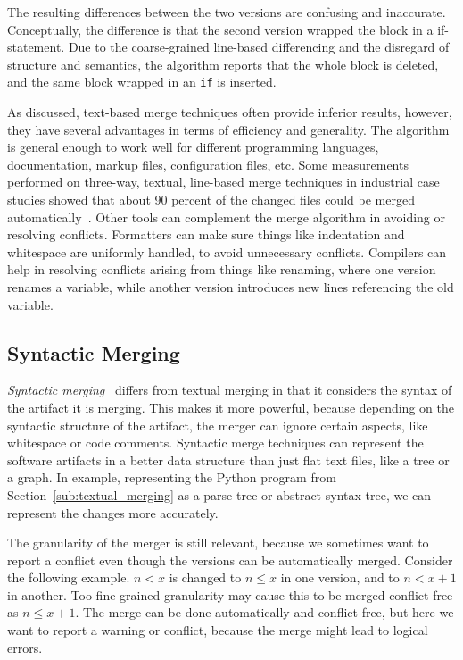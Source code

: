 \documentclass[a4paper,english]{ifimaster}
\begin{document}
The resulting differences between the two versions are confusing and inaccurate. Conceptually, the difference is that the second version wrapped the block in a if-statement. Due to the coarse-grained line-based differencing and the disregard of structure and semantics, the algorithm reports that the whole block is deleted, and the same block wrapped in an \texttt{if} is inserted.

As discussed, text-based merge techniques often provide inferior results, however, they have several advantages in terms of efficiency and generality. The algorithm is general enough to work well for different programming languages, documentation, markup files, configuration files, etc. Some measurements performed on three-way, textual, line-based merge techniques in industrial case studies showed that about 90 percent of the changed files could be merged automatically~\cite{cite:large_scale_case_study}. Other tools can complement the merge algorithm in avoiding or resolving conflicts. Formatters can make sure things like indentation and whitespace are uniformly handled, to avoid unnecessary conflicts. Compilers can help in resolving conflicts arising from things like renaming, where one version renames a variable, while another version introduces new lines referencing the old variable.

\subsection{Syntactic Merging}%
\label{sub:syntactic_merging}

\textit{Syntactic merging}~\cite{cite:syntactic_software_merging} differs from textual merging in that it considers the syntax of the artifact it is merging. This makes it more powerful, because depending on the syntactic structure of the artifact, the merger can ignore certain aspects, like whitespace or code comments. Syntactic merge techniques can represent the software artifacts in a better data structure than just flat text files, like a tree or a graph. In example, representing the Python program from Section~\vref{sub:textual_merging} as a parse tree or abstract syntax tree, we can represent the changes more accurately.

The granularity of the merger is still relevant, because we sometimes want to report a conflict even though the versions can be automatically merged. Consider the following example. $n < x$ is changed to $n \leq x$ in one version, and to $n < x + 1$ in another. Too fine grained granularity may cause this to be merged conflict free as $n \leq x + 1$. The merge can be done automatically and conflict free, but here we want to report a warning or conflict, because the merge might lead to logical errors.
\end{document}
